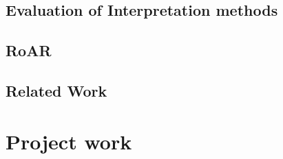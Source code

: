\section{Evaluation of Interpretation methods}

\section{RoAR}


\section{Related Work}



\chapter{Project work}



